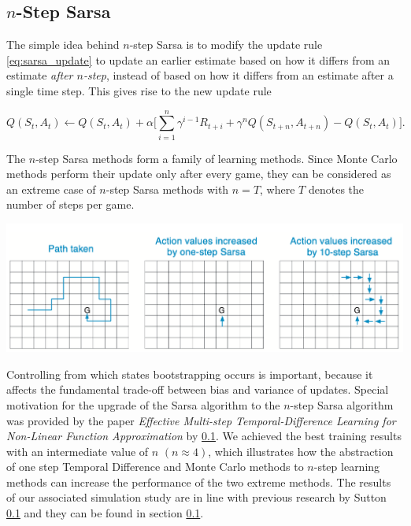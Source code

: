 \subsection{$n$-Step Sarsa}

The simple idea behind $n$-step Sarsa is to modify the update rule \eqref{eq:sarsa_update} to update an earlier estimate based on how it differs from an  estimate \emph{after $n$-step}, instead of based on how it differs from an estimate after a single time step. This gives rise to the new update rule

\begin{equation} \label{eq:n_step_sarsa_update}
	Q(S_t, A_t) \leftarrow Q(S_t, A_t) + \alpha \big[\sum_{i=1}^n \gamma^{i-1}R_{t+i} + \gamma^n Q(S_{t+n}, A_{t+n}) - Q(S_t, A_t)\big].
\end{equation}

The $n$-step Sarsa methods form a family of learning methods. Since Monte Carlo methods perform their update only after every game, they can be considered as an extreme case of $n$-step Sarsa methods with $n = T$, where $T$ denotes the number of steps per game. 

\begin{center}
\includegraphics[scale=0.5]{graphics/n_step_sarsa.png}
\end{center}


Controlling from which states bootstrapping occurs is important, because it affects the fundamental trade-off between bias and variance of updates. Special motivation for the upgrade of the Sarsa algorithm to the $n$-step Sarsa algorithm was provided by the paper \emph{Effective Multi-step Temporal-Difference Learning for Non-Linear Function Approximation} by \ref{}. We achieved the best training results with an intermediate value of $n$ $(n \approx 4)$, which illustrates how the abstraction of one step Temporal Difference and Monte Carlo methods to $n$-step learning methods can increase the performance of the two extreme methods. The results of our associated simulation study are in line with previous research by Sutton \ref{} and they can be found in section \ref{}. 

